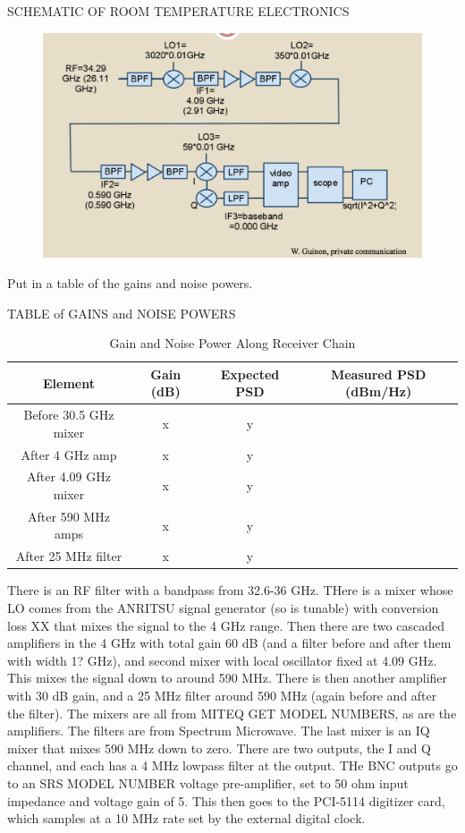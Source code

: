 \documentclass[11pt]{article}
\begin{document}
SCHEMATIC OF ROOM TEMPERATURE ELECTRONICS
\begin{figure}
\includegraphics[scale=0.3]{receiverdiagram}
\end{figure}

Put in a table of the gains and noise powers.

TABLE of GAINS and NOISE POWERS
\begin{table}[ht]
\caption{Gain and Noise Power Along Receiver Chain}
\begin{tabular}{c c c c}
\hline\hline
Element & Gain (dB) & Expected PSD & Measured PSD (dBm/Hz)\\ [0.5ex]
\hline
Before 30.5 GHz mixer & x & y \\
After 4 GHz amp & x & y \\
After 4.09 GHz mixer & x & y \\
After 590 MHz amps & x & y \\
After 25 MHz filter & x & y \\ [1ex]
\hline
\end{tabular}
\label{table:gainsofreceiverchain}
\end{table}

There is an RF filter with a bandpass from 32.6-36 GHz. THere is a mixer whose LO comes from the ANRITSU signal generator (so is tunable) with conversion loss XX that mixes the signal to the 4 GHz range. Then there are two cascaded amplifiers in the 4 GHz with total gain 60 dB (and a filter before and after them with width 1? GHz), and second mixer with local oscillator fixed at 4.09 GHz. This mixes the signal down to around 590 MHz. There is then another amplifier with 30 dB gain, and a 25 MHz filter around 590 MHz (again before and after the filter). The mixers are all from MITEQ GET MODEL NUMBERS, as are the amplifiers. The filters are from Spectrum Microwave. The last mixer is an IQ mixer that mixes 590 MHz down to zero. There are two outputs, the I and Q channel, and each has a 4 MHz lowpass filter at the output. THe BNC outputs go to an SRS MODEL NUMBER voltage pre-amplifier, set to 50 ohm input impedance and voltage gain of 5. This then goes to the PCI-5114 digitizer card, which samples at a 10 MHz rate set by the external digital clock.
\end{document}
